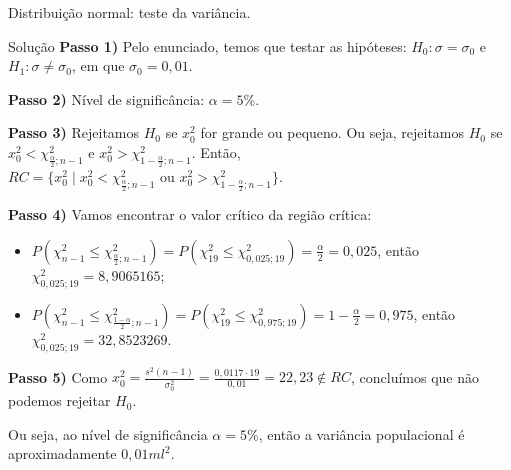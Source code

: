 \documentclass[8pt]{beamer}
\begin{document}
\begin{frame}{Distribuição normal: teste da variância.}

\begin{block}{Solução}
	\textbf{Passo 1)} Pelo enunciado, temos que testar as hipóteses: $H_0: \sigma = \sigma_0$ e $H_1: \sigma \neq \sigma_0$, em que $\sigma_0=0,01$.

	\textbf{Passo 2)} Nível de significância: $\alpha=5\%$.
	
	\textbf{Passo 3)} Rejeitamos $H_0$ se $ x_0^2  $ for grande ou pequeno. Ou seja, rejeitamos $H_0$ se $ x_0^2  < \chi_{\frac{\alpha}{2};n-1}^2$  e $x_0^2 > \chi_{1-\frac{\alpha}{2}; n-1}^2$. Então, $RC=\{ x_0^2 \mid x_0^2 < \chi_{\frac{\alpha}{2};n-1}^2 \mbox{ ou } x_0^2 > \chi_{1-\frac{\alpha}{2};n-1}^2 \}.$ 

	
	\textbf{Passo 4)} Vamos encontrar o valor crítico da região crítica:
	\begin{itemize}
		\item $P\left( \chi_{n-1}^2 \leq \chi_{\frac{\alpha}{2};n-1}^2 \right) = P\left( \chi_{19}^2  \leq \chi_{0,025;19}^2 \right) = \frac{\alpha}{2} = 0,025$, então $\chi_{0,025;19}^2=8,9065165$;
		\item $P\left( \chi_{n-1}^2 \leq \chi_{\frac{1-\alpha}{2};n-1}^2 \right) = P\left( \chi_{19}^2  \leq \chi_{0,975;19}^2 \right) = 1 - \frac{\alpha}{2} = 0,975$, então $\chi_{0,025;19}^2=32,8523269$.
	\end{itemize}

	\textbf{Passo 5)} Como $x_0^2 = \frac{s^2(n-1)}{\sigma_0^2} = \frac{0,0117\cdot 19}{0,01}=22,23 \not\in RC$, concluímos que não podemos rejeitar $H_0$.
	
	Ou seja, ao nível de significância $\alpha=5\%$, então a variância populacional é aproximadamente $0,01 ml^2$.
\end{block}
\end{frame}
\end{document}

